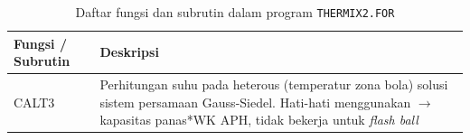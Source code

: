 \documentclass[a4paper,11pt]{report}
\begin{document}
\begin{table}[h!]
  \caption{Daftar fungsi dan subrutin dalam program \texttt{THERMIX2.FOR}}
  \label{tab:the2}

  \begin{center}
    \begin{tabular}{p{3cm}|p{10cm}} \toprule
    Fungsi / Subrutin & Deskripsi\\ \midrule
    CALT3 & Perhitungan suhu pada heterous (temperatur zona bola) solusi sistem persamaan Gauss-Siedel. Hati-hati menggunakan $\rightarrow$ kapasitas panas*WK APH, tidak bekerja untuk \textit{flash ball} \\
    \bottomrule
    \end{tabular}
  \end{center}
\end{table}





%	
%	
\end{document}
